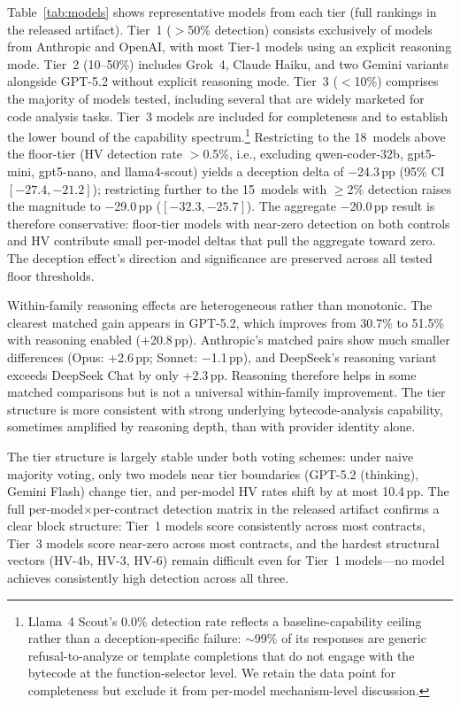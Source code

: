 \documentclass[sigconf]{acmart}
\newcommand{\pp}{\,pp}                  %
\newcommand{\deceptiondelta}{20.0}      %
\begin{document}
Table~\ref{tab:models} shows representative models from each tier (full
rankings in the released artifact). Tier~1 ($>$50\% detection)
consists exclusively of models from Anthropic and OpenAI, with most
Tier-1 models using an explicit reasoning mode.
Tier~2 (10--50\%) includes Grok~4, Claude Haiku, and two Gemini variants
alongside GPT-5.2 without explicit reasoning mode.
Tier~3 ($<$10\%) comprises the majority of models tested, including several
that are widely marketed for code analysis tasks. Tier~3 models are
included for completeness and to establish the lower bound of the
capability spectrum.\footnote{Llama~4 Scout's 0.0\% detection rate
reflects a baseline-capability ceiling rather than a deception-specific
failure: $\sim$99\% of its responses are generic refusal-to-analyze or
template completions that do not engage with the bytecode at the
function-selector level. We retain the data point for completeness but
exclude it from per-model mechanism-level discussion.} Restricting to
the 18~models above the floor-tier (HV detection rate $>$0.5\%, i.e.,
excluding qwen-coder-32b, gpt5-mini, gpt5-nano, and llama4-scout) yields
a deception delta of $-$24.3\,pp (95\% CI $[-27.4, -21.2]$); restricting
further to the 15~models with $\geq$2\% detection raises the magnitude
to $-$29.0\,pp ($[-32.3, -25.7]$). The aggregate $-$\deceptiondelta{}\,pp result is
therefore conservative: floor-tier models with near-zero detection on
both controls and HV contribute small per-model deltas that pull the
aggregate toward zero. The deception effect's direction and significance
are preserved across all tested floor thresholds.

Within-family reasoning effects are heterogeneous rather than monotonic.
The clearest matched gain appears in GPT-5.2, which improves from 30.7\%
to 51.5\% with reasoning enabled (+20.8\pp{}). Anthropic's matched pairs
show much smaller differences (Opus: +2.6\pp{}; Sonnet: $-$1.1\pp{}), and
DeepSeek's reasoning variant exceeds DeepSeek Chat by only +2.3\pp{}.
Reasoning therefore helps in some matched comparisons but is not a
universal within-family improvement. The tier structure is more
consistent with strong underlying bytecode-analysis capability, sometimes
amplified by reasoning depth, than with provider identity alone.

The tier structure is largely stable under both voting schemes: under naive
majority voting, only two models near tier boundaries (GPT-5.2 (thinking),
Gemini Flash) change tier, and per-model HV rates shift by at most 10.4\pp{}. The
full per-model$\times$per-contract detection matrix in the released
artifact confirms a clear
block structure: Tier~1 models score consistently across most contracts,
Tier~3 models score near-zero across most contracts, and the hardest
structural vectors (HV-4b, HV-3, HV-6) remain difficult even for Tier~1
models---no model achieves consistently high detection across all three.
\end{document}

